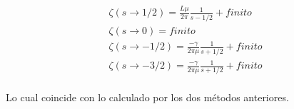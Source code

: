 \begin{equation}
\begin{array}{c}

\zeta(s \rightarrow 1/2) = \frac{L \mu }{2 \pi} \frac{1}{s-1/2} + finito\\[10pt]

\zeta(s \rightarrow 0) = finito \\[10pt]

\zeta (s \rightarrow - 1/2)  = \frac{ - \gamma  }{2 \pi \mu } \frac{1}{s + 1/2} + finito \\[10pt]

\zeta (s \rightarrow - 3/2)  = \frac{ - \gamma  }{2 \pi \mu } \frac{1}{s + 1/2} + finito \\[10pt]

\end{array}
\end{equation}


Lo cual coincide con lo calculado por los dos métodos anteriores.
